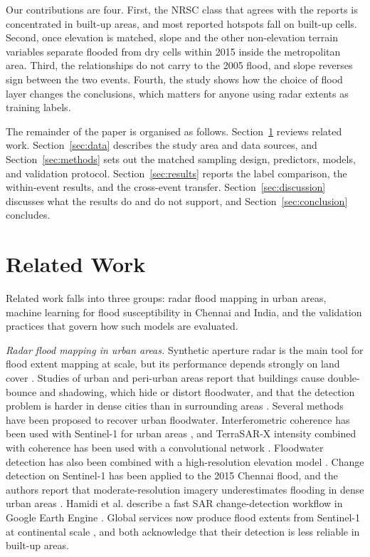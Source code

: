 \documentclass[conference]{IEEEtran}
\begin{document}
Our contributions are four. First, the NRSC class that agrees with the reports is concentrated in built-up areas, and most reported hotspots fall on built-up cells. Second, once elevation is matched, slope and the other non-elevation terrain variables separate flooded from dry cells within 2015 inside the metropolitan area. Third, the relationships do not carry to the 2005 flood, and slope reverses sign between the two events. Fourth, the study shows how the choice of flood layer changes the conclusions, which matters for anyone using radar extents as training labels.

The remainder of the paper is organised as follows. Section~\ref{sec:related} reviews related work. Section~\ref{sec:data} describes the study area and data sources, and Section~\ref{sec:methods} sets out the matched sampling design, predictors, models, and validation protocol. Section~\ref{sec:results} reports the label comparison, the within-event results, and the cross-event transfer. Section~\ref{sec:discussion} discusses what the results do and do not support, and Section~\ref{sec:conclusion} concludes.

\section{Related Work}\label{sec:related}
Related work falls into three groups: radar flood mapping in urban areas, machine learning for flood susceptibility in Chennai and India, and the validation practices that govern how such models are evaluated.

\textit{Radar flood mapping in urban areas.} Synthetic aperture radar is the main tool for flood extent mapping at scale, but its performance depends strongly on land cover \cite{almehedi2025,shen2019}. Studies of urban and peri-urban areas report that buildings cause double-bounce and shadowing, which hide or distort floodwater, and that the detection problem is harder in dense cities than in surrounding areas \cite{almehedi2025,wagner2026gfm}. Several methods have been proposed to recover urban floodwater. Interferometric coherence has been used with Sentinel-1 for urban areas \cite{chini2019}, and TerraSAR-X intensity combined with coherence has been used with a convolutional network \cite{li2019urban}. Floodwater detection has also been combined with a high-resolution elevation model \cite{mason2021urban}. Change detection on Sentinel-1 has been applied to the 2015 Chennai flood, and the authors report that moderate-resolution imagery underestimates flooding in dense urban areas \cite{vanama2019}. Hamidi et al. describe a fast SAR change-detection workflow in Google Earth Engine \cite{hamidi2023}. Global services now produce flood extents from Sentinel-1 at continental scale \cite{wagner2026gfm,misra2025}, and both acknowledge that their detection is less reliable in built-up areas.
\end{document}
